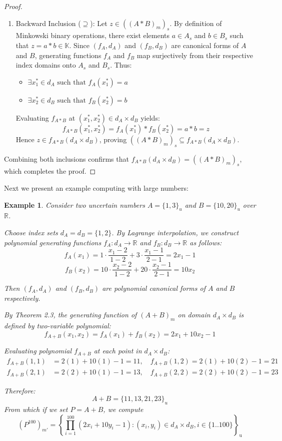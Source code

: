 \documentclass[a4paper,12pt,twoside]{memoir}
\newtheorem{example}{Example}[chapter]
\newcommand{\set}[1]{\left\{#1\right\}} %
\newcommand{\s}[1]{\set{#1}_\mathrm{u}} %
\newcommand{\kgdt}[1]{\left(#1\right)_m} %
\newcommand{\kgdtmr}[1]{\left(#1\right)_{m'}} %
\begin{document}
\begin{proof}
\begin{enumerate}[leftmargin=*]
			\item Backward Inclusion ($\supseteq$):
			Let $z \in (\kgdt{A * B})_s$. By definition of Minkowski binary operations, there exist elements $a \in A_s$ and $b \in B_s$ such that $z = a * b \in \mathbb{K}$.
			Since $(f_A, d_A)$ and $(f_B, d_B)$ are canonical forms of $A$ and $B$, generating functions $f_A$ and $f_B$ map surjectively from their respective index domains onto $A_s$ and $B_s$. Thus:
			\begin{itemize}
				\item $\exists x_1^* \in d_A \text{ such that } f_A(x_1^*) = a$
				\item $\exists x_2^* \in d_B \text{ such that } f_B(x_2^*) = b$
			\end{itemize}
			Evaluating $f_{A*B}$ at $(x_1^*, x_2^*) \in d_A \times d_B$ yields:
			\[
			f_{A*B}(x_1^*, x_2^*) = f_A(x_1^*) * f_B(x_2^*) = a * b = z
			\]
			Hence $z \in f_{A*B}(d_A \times d_B)$, proving $(\kgdt{A * B})_s \subseteq f_{A*B}(d_A \times d_B)$.
		\end{enumerate}
		
		Combining both inclusions confirms that $f_{A*B}(d_A \times d_B) = (\kgdt{A * B})_s$, which completes the proof.
	\end{proof}
	
	Next we present an example computing with large numbers:
	
	\begin{example}
		Consider two uncertain numbers $A = \{1, 3\}_u$ and $B = \{10, 20\}_u$ over $\mathbb{R}$.
		
		Choose index sets $d_A = d_B = \{1, 2\}$. By Lagrange interpolation, we construct polynomial generating functions $f_A: d_A \to \mathbb{R}$ and $f_B: d_B \to \mathbb{R}$ as follows:
		$$f_A(x_1) = 1 \cdot \frac{x_1 - 2}{1 - 2} + 3 \cdot \frac{x_1 - 1}{2 - 1} = 2x_1 - 1$$
		$$f_B(x_2) = 10 \cdot \frac{x_2 - 2}{1 - 2} + 20 \cdot \frac{x_2 - 1}{2 - 1} = 10x_2$$
		
		Then $(f_A, d_A)$ and $(f_B, d_B)$ are polynomial canonical forms of $A$ and $B$ respectively.
		
		By Theorem 2.3, the generating function of $(A + B)_m$ on domain $d_A \times d_B$ is defined by two-variable polynomial:
		$$f_{A+B}(x_1, x_2) = f_A(x_1) + f_B(x_2) = 2x_1 + 10x_2 - 1$$
		
		Evaluating polynomial $f_{A+B}$ at each point in $d_A \times d_B$:
		\begin{align*}
			f_{A+B}(1, 1) & = 2(1) + 10(1) - 1 = 11, \quad f_{A+B}(1, 2) = 2(1) + 10(2) - 1 = 21  \\
			f_{A+B}(2, 1) & = 2(2) + 10(1) - 1 = 13, \quad f_{A+B}(2, 2) = 2(2) + 10(2) - 1 = 23
		\end{align*}
		
		Therefore:
		$$ A + B = \{11, 13, 21, 23\}_u$$
		From which if we set $P = A+B$, we compute
		\[\kgdtmr{P^{100}} = \s{\prod_{i=1}^{100}{(2x_i + 10 y_i - 1)}: (x_i,y_i) \in d_A \times d_B, i \in \{1..100\}}\]
	\end{example}
	
\end{document}
